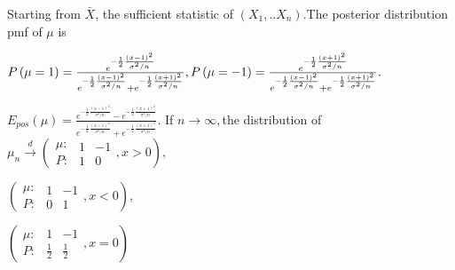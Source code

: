 \documentclass{article}
\begin{document}


Starting from $\bar{X}$, the sufficient statistic of $\left(
X_{1},..X_{n}\right) .$The posterior distribution pmf of $\mu $ is

$P\left( \mu =1\right) =\frac{e^{-\frac{1}{2}\frac{\left( x-1\right) ^{2}}{%
\sigma ^{2}/n}}}{e^{-\frac{1}{2}\frac{\left( x-1\right) ^{2}}{\sigma ^{2}/n}%
}+e^{-\frac{1}{2}\frac{\left( x+1\right) ^{2}}{\sigma ^{2}/n}}},P\left( \mu
=-1\right) =\frac{e^{-\frac{1}{2}\frac{\left( x+1\right) ^{2}}{\sigma ^{2}/n}%
}}{e^{-\frac{1}{2}\frac{\left( x-1\right) ^{2}}{\sigma ^{2}/n}}+e^{-\frac{1}{%
2}\frac{\left( x+1\right) ^{2}}{\sigma ^{2}/n}}}.$

\bigskip $E_{pos}\left( \mu \right) =\frac{e^{-\frac{1}{2}\frac{\left(
x-1\right) ^{2}}{\sigma ^{2}/n}}-e^{-\frac{1}{2}\frac{\left( x+1\right) ^{2}%
}{\sigma ^{2}/n}}}{e^{-\frac{1}{2}\frac{\left( x-1\right) ^{2}}{\sigma ^{2}/n%
}}+e^{-\frac{1}{2}\frac{\left( x+1\right) ^{2}}{\sigma ^{2}/n}}}.$ If $%
n\rightarrow \infty ,$the distribution of $\mu _{n}\overset{d}{\rightarrow }%
\left( 
\begin{array}{c}
\mu : \\ 
P:%
\end{array}%
\begin{array}{cc}
1 & -1 \\ 
1 & 0%
\end{array}%
,x>0\right) ,$

$\left( 
\begin{array}{c}
\mu : \\ 
P:%
\end{array}%
\begin{array}{cc}
1 & -1 \\ 
0 & 1%
\end{array}%
,x<0\right) ,$

$\left( 
\begin{array}{c}
\mu : \\ 
P:%
\end{array}%
\begin{array}{cc}
1 & -1 \\ 
\frac{1}{2} & \frac{1}{2}%
\end{array}%
,x=0\right) $

\bigskip

\bigskip 
\end{document}
